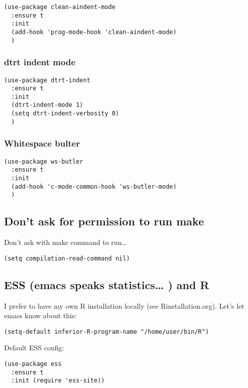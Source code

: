 \documentclass[12pt]{article}
\begin{document}
\begin{verbatim}
(use-package clean-aindent-mode
  :ensure t 
  :init 
  (add-hook 'prog-mode-hook 'clean-aindent-mode)
  )
\end{verbatim}

\subsubsection{dtrt indent mode}
\label{sec:org080ab8e}

\begin{verbatim}
(use-package dtrt-indent 
  :ensure t
  :init 
  (dtrt-indent-mode 1)
  (setq dtrt-indent-verbosity 0)
  )
\end{verbatim}

\subsubsection{Whitespace bulter}
\label{sec:org49cbe33}

\begin{verbatim}
(use-package ws-butler
  :ensure t 
  :init
  (add-hook 'c-mode-common-hook 'ws-butler-mode)
  )
\end{verbatim}


\subsection{Don't ask for permission to run make}
\label{sec:orgd286755}
Don't ask with make command to run\ldots{}
\begin{verbatim}
(setq compilation-read-command nil)
\end{verbatim}

\subsection{ESS  (emacs speaks statistics\ldots{} ) and R}
\label{sec:orge796ab4}

I prefer to have my own R installation locally (see Rinstallation.org). Let's let emacs know about this: 

\begin{verbatim}
(setq-default inferior-R-program-name "/home/user/bin/R")
\end{verbatim}

Default ESS config: 
\begin{verbatim}
(use-package ess
  :ensure t
  :init (require 'ess-site))
\end{verbatim}
\end{document}
